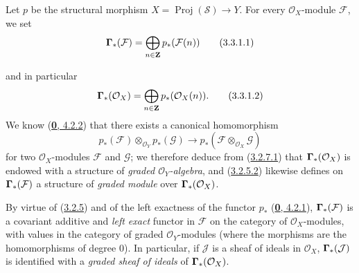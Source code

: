 \begin{env}[3.3.1]
\label{II.3.3.1}
Let $p$ be the structural morphism $X=\operatorname{Proj}(\mathcal{S})\to Y$.
For every $\mathcal{O}_X$-module $\mathcal{F}$, we set
\[
\label{II.3.3.1.1}
  \boldsymbol{\Gamma}_*(\mathcal{F})
  =\bigoplus_{n\in\mathbf{Z}}p_*(\mathcal{F}(n))
\tag{3.3.1.1}
\]


and in particular
\[
\label{II.3.3.1.2}
  \boldsymbol{\Gamma}_*(\mathcal{O}_X)
  =\bigoplus_{n\in\mathbf{Z}}p_*(\mathcal{O}_X(n)).
\tag{3.3.1.2}
\]
We know (\hyperref[0.4.2.2]{\textbf{0}, 4.2.2}) that there exists a canonical
homomorphism
\[
  p_*(\mathcal{F})\otimes_{\mathcal{O}_Y}p_*(\mathcal{G})
  \longrightarrow
  p_*(\mathcal{F}\otimes_{\mathcal{O}_X}\mathcal{G})
\]
for two $\mathcal{O}_X$-modules $\mathcal{F}$ and $\mathcal{G}$; we therefore
deduce from (\hyperref[II.3.2.7.1]{3.2.7.1}) that
$\boldsymbol{\Gamma}_*(\mathcal{O}_X)$ is endowed with a structure of
\emph{graded $\mathcal{O}_Y$-algebra}, and
(\hyperref[II.3.2.5.2]{3.2.5.2}) likewise defines on
$\boldsymbol{\Gamma}_*(\mathcal{F})$ a structure of \emph{graded module} over
$\boldsymbol{\Gamma}_*(\mathcal{O}_X)$.

By virtue of (\hyperref[II.3.2.5]{3.2.5}) and of the left exactness of the
functor $p_*$ (\hyperref[0.4.2.1]{\textbf{0}, 4.2.1}),
$\boldsymbol{\Gamma}_*(\mathcal{F})$ is a covariant additive and \emph{left exact}
functor in $\mathcal{F}$ on the category of $\mathcal{O}_X$-modules, with
values in the category of graded $\mathcal{O}_Y$-modules (where the morphisms
are the homomorphisms of degree $0$). In particular, if $\mathcal{J}$ is a
sheaf of ideals in $\mathcal{O}_X$, $\boldsymbol{\Gamma}_*(\mathcal{J})$ is identified
with a \emph{graded sheaf of ideals} of $\boldsymbol{\Gamma}_*(\mathcal{O}_X)$.
\end{env}

